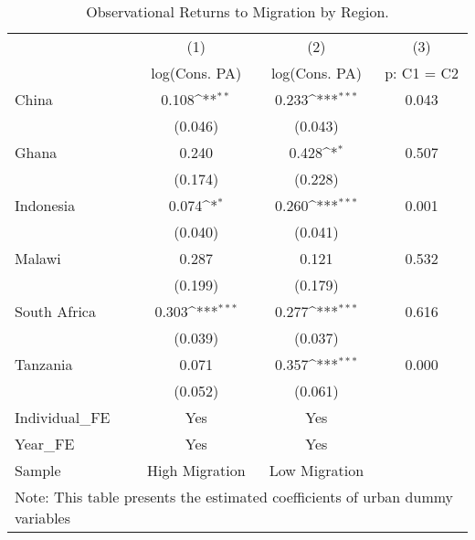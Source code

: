 \begin{table}[htbp]\centering
\def\sym#1{\ifmmode^{#1}\else\(^{#1}\)\fi}
\caption{Observational Returns to Migration by Region.}
\begin{tabular}{l*{3}{c}}
\toprule
                    &\multicolumn{1}{c}{(1)}&\multicolumn{1}{c}{(2)}&\multicolumn{1}{c}{(3)}\\
                    &\multicolumn{1}{c}{log(Cons. PA)}&\multicolumn{1}{c}{log(Cons. PA)}&\multicolumn{1}{c}{p: C1 = C2}\\
\midrule
China               &       0.108\sym{**} &       0.233\sym{***}&       0.043         \\
                    &     (0.046)         &     (0.043)         &                     \\
\addlinespace
Ghana               &       0.240         &       0.428\sym{*}  &       0.507         \\
                    &     (0.174)         &     (0.228)         &                     \\
\addlinespace
Indonesia           &       0.074\sym{*}  &       0.260\sym{***}&       0.001         \\
                    &     (0.040)         &     (0.041)         &                     \\
\addlinespace
Malawi              &       0.287         &       0.121         &       0.532         \\
                    &     (0.199)         &     (0.179)         &                     \\
\addlinespace
South Africa        &       0.303\sym{***}&       0.277\sym{***}&       0.616         \\
                    &     (0.039)         &     (0.037)         &                     \\
\addlinespace
Tanzania            &       0.071         &       0.357\sym{***}&       0.000         \\
                    &     (0.052)         &     (0.061)         &                     \\
\midrule
Individual\_FE       &         Yes         &         Yes         &                     \\
Year\_FE             &         Yes         &         Yes         &                     \\
Sample              &High Migration         &Low Migration         &                     \\
\bottomrule
\multicolumn{4}{l}{\footnotesize Note: This table presents the estimated coefficients of urban dummy variables}\\

\end{tabular}
\end{table}
